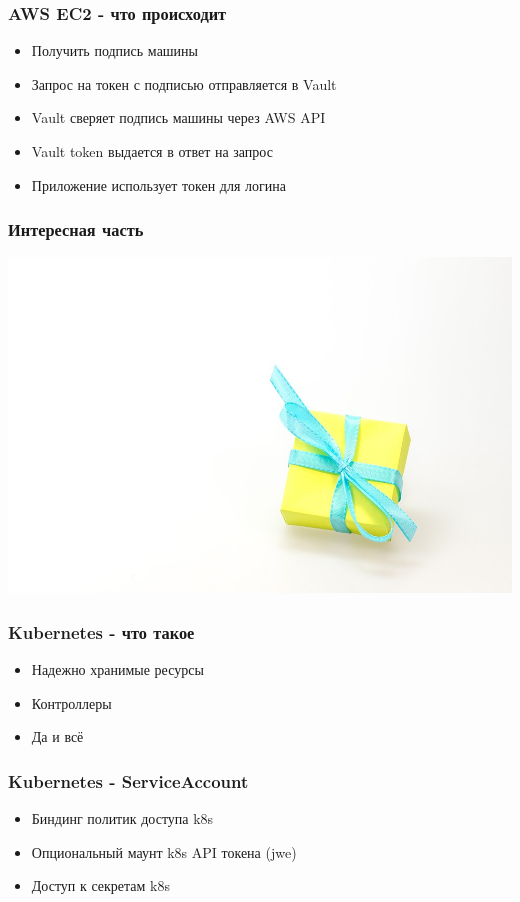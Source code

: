 \documentclass[mathserif,serif]{beamer}
\begin{document}
\begin{frame}
	\frametitle{AWS EC2 - что происходит}
	\begin{itemize}
		\item{Получить подпись машины}
		\item{Запрос на токен с подписью отправляется в Vault}
		\item{Vault сверяет подпись машины через AWS API}
		\item{Vault token выдается в ответ на запрос}
		\item{Приложение использует токен для логина}
	\end{itemize}
\end{frame}

\begin{frame}
	\frametitle{Интересная часть}
	\includegraphics[width=\linewidth]{gift.jpg}
\end{frame}

\begin{frame}
	\frametitle{Kubernetes - что такое}
	\begin{itemize}
		\item{Надежно хранимые ресурсы}
		\item{Контроллеры}
		\item{Да и всё}
	\end{itemize}
\end{frame}

\begin{frame}
	\frametitle{Kubernetes - ServiceAccount}
	\begin{itemize}
		\item{Биндинг политик доступа k8s}
		\item{Опциональный маунт k8s API токена (jwe)}
		\item{Доступ к секретам k8s}
	\end{itemize}
\end{frame}
\end{document}
